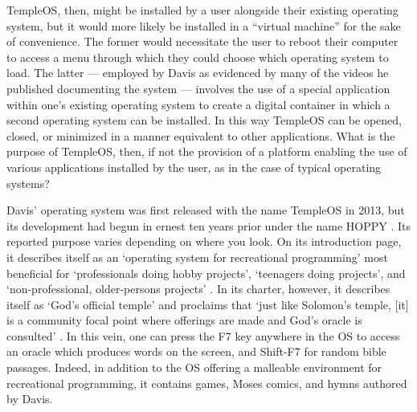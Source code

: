 \documentclass[Draft.tex]{subfiles}
\begin{document}

TempleOS, then, might be installed by a user alongside their existing
operating system, but it would more likely be installed
in a ``virtual machine'' for the sake of convenience.
The former would necessitate the user to reboot their computer
to access a menu through which they could choose which operating system to
load.
The latter --- employed by Davis as evidenced by many of the
videos he published documenting the system --- involves the use of a special
application within one's existing operating system to create a digital container
in which a second operating system can be installed.
In this way TempleOS can be opened, closed, or minimized in a manner
equivalent to other applications.
What is the purpose of TempleOS, then, if not the provision of a platform
enabling the use of various applications installed by the user,
as in the case of typical operating systems?

Davis' operating system was first released with the name TempleOS in 2013,
but its development had begun in ernest ten years prior under the name
HOPPY \parencite{History}.
Its reported purpose varies depending on where you look.
On its introduction page, it describes itself as
an `operating system for recreational programming' most beneficial for
`professionals doing hobby projects', `teenagers doing projects',
and `non-professional, older-persons projects'
\parencite{Welcome}.
In its charter, however, it describes itself as `God's official temple'
and proclaims that
`just like Solomon’s temple, [it] is a community focal point
where offerings are made and God’s oracle is consulted'
\parencite{Charter}.
In this vein, one can press the F7 key anywhere in the OS
to access an oracle which produces words on the screen,
and Shift-F7 for random bible passages.
Indeed, in addition to the OS offering
a malleable environment for recreational programming,
it contains games, Moses comics, and hymns authored by Davis.
\end{document}
